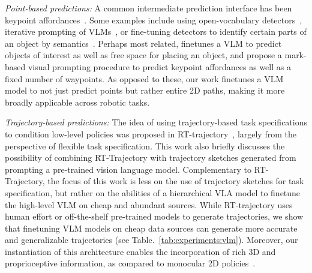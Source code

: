 
\emph{Point-based predictions:} A common intermediate prediction interface has been keypoint affordances~\citep{stone2023open,sundaresan2023kite,nasiriany2024pivot,yuan2024robopoint}. Some examples include using open-vocabulary detectors~\citep{minderer2022simple}, iterative prompting of VLMs~\citep{nasiriany2024pivot}, or fine-tuning detectors to identify certain parts of an object by semantics~\citep{sundaresan2023kite}. Perhaps most related, \cite{yuan2024robopoint} finetunes a VLM to predict objects of interest as well as free space for placing an object, and \cite{liu2024moka} propose a mark-based visual prompting procedure to predict keypoint affordances as well as a fixed number of waypoints. As opposed to these, our work finetunes a VLM model to not just predict points but rather entire 2D paths, making it more broadly applicable across robotic tasks. 

\emph{Trajectory-based predictions:} The idea of using trajectory-based task specifications to condition low-level policies was proposed in RT-trajectory~\citep{gu2023rttrajectory}, largely from the perspective of flexible task specification. This work also briefly discusses the possibility of combining RT-Trajectory with trajectory sketches generated from prompting a pre-trained vision language model. Complementary to RT-Trajectory, the focus of this work is less on the use of trajectory sketches for task specification, but rather on the abilities of a hierarchical VLA model to finetune the high-level VLM on cheap and abundant sources. %
While RT-trajectory uses human effort or off-the-shelf pre-trained models to generate trajectories, we show that finetuning VLM models on cheap data sources can generate more accurate and generalizable trajectories (see Table.~\ref{tab:experiments:vlm}). Moreover, our instantiation of this architecture enables the incorporation of rich 3D and proprioceptive information, as compared to monocular 2D policies~\citep{gu2023rttrajectory}. 